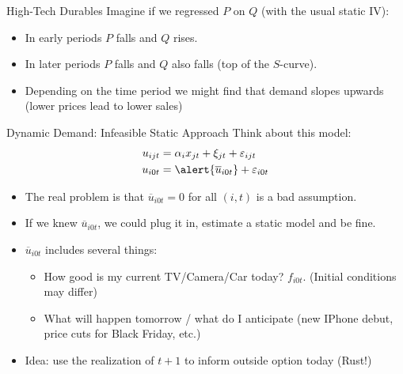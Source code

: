 \documentclass[aspectratio=169,11pt]{beamer}
\begin{document}
\begin{frame}{High-Tech Durables}
Imagine if we regressed $P$ on $Q$ (with the usual static IV):
\begin{itemize}
\item In early periods $P$ falls and $Q$ rises.
\item In later periods $P$ falls and $Q$ also falls (top of the $S$-curve).
\item Depending on the time period we might find that demand slopes \alert{upwards} (lower prices lead to lower sales)
\end{itemize}
\end{frame}

\begin{frame}{Dynamic Demand: Infeasible Static Approach}
Think about this model:
\begin{align*}
u_{ijt} &=   \alpha_i x_{jt}  +  \xi_{jt} + \varepsilon_{ijt}\\
u_{i0t} &=  \alert{\overline{u}_{i0t}} + \varepsilon_{i0t} 
\end{align*}
\vspace{-0.5cm}
\begin{itemize}
\item The real problem is that $\overline{u}_{i0t}=0$ for all $(i,t)$ is a bad assumption.
\item If we knew $\overline{u}_{i0t}$, we could plug it in, estimate a static model and be fine.
\item $\overline{u}_{i0t}$ includes several things:
\begin{itemize}
	\item How good is my current TV/Camera/Car today? $f_{i0t}$. (Initial conditions may differ)
	\item What will happen tomorrow / what do I anticipate (new IPhone debut, price cuts for Black Friday, etc.)
\end{itemize}
\item \alert{Idea: use the realization of $t+1$ to inform outside option today (Rust!)}
\end{itemize}
\end{frame}
\end{document}
